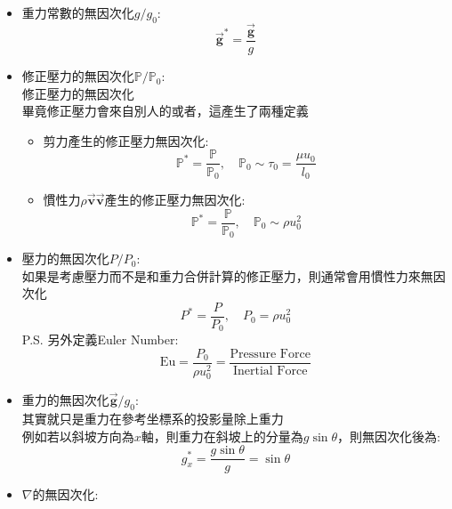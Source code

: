 \documentclass[../main.tex]{subfiles}
\begin{document}
\begin{itemize}
\begin{itemize}
\begin{equation}
      t^\ast = \frac{t}{t_0} , \quad t_0 = \frac{l_0}{u_0}
    \end{equation}
    至於$L$是要取哪個方向，通常是探討的分布的方向
    \item 重力常數的無因次化$g/g_0$:
    \begin{equation}
      \vec {\bm g}^\ast = \frac{\vec {\bm g}}{g}
    \end{equation}
    \item 修正壓力的無因次化$\mathbb{P}/\mathbb{P}_0$:\\
    修正壓力的無因次化\\
    畢竟修正壓力會來自別人的或者，這產生了兩種定義
    \begin{itemize}
      \item 剪力產生的修正壓力無因次化:
      \begin{equation}
        \mathbb P^\ast = \frac{\mathbb P}{\mathbb P_0},\quad \mathbb P_0 \sim \tau_0 = \frac{\mu u_0}{l_0}
      \end{equation}
      \item 慣性力$\rho \vec{\bm v}\vec{\bm v}$產生的修正壓力無因次化:
      \begin{equation}
        \mathbb P^\ast = \frac{\mathbb P}{\mathbb P_0},\quad \mathbb P_0 \sim \rho u_0^2
      \end{equation}
    \end{itemize}
    \item 壓力的無因次化$P/P_0$:\\
      如果是考慮壓力而不是和重力合併計算的修正壓力，則通常會用慣性力來無因次化
      \begin{equation}
        P^\ast = \frac{P}{P_0}, \quad P_0 = \rho u_0^2
      \end{equation}
      P.S. 另外定義Euler Number:
      \begin{equation}
        \text{Eu} = \frac{P_0}{\rho u_0^2} = \frac{\text{Pressure Force}}{\text{Inertial Force}}
      \end{equation}
    \item 重力的無因次化$\bm \vec{g}/g_0$:\\
    其實就只是重力在參考坐標系的投影量除上重力\\
    例如若以斜坡方向為$x$軸，則重力在斜坡上的分量為$g\sin\theta$，則無因次化後為:
    \begin{equation}
      g_x^\ast = \frac{g\sin\theta}{g} = \sin\theta
    \end{equation}
    \item $\nabla$的無因次化:

\end{itemize}
\end{itemize}
\end{document}
